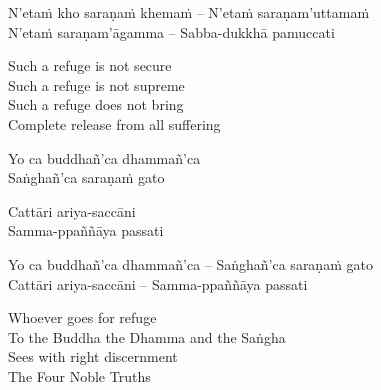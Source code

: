 \else

\begin{verses}
  N'etaṁ kho saraṇaṁ khemaṁ – N'etaṁ saraṇam'uttamaṁ\\
  N'etaṁ saraṇam'āgamma – Sabba-dukkhā pamuccati
\end{verses}

\fi

\begin{english-verses}
  Such a refuge is not secure\\
  Such a refuge is not supreme\\
  Such a refuge does not bring\\
  Complete release from all suffering\ifdigital\makeatletter\hyperlink{endnote32-appendix}\makeatother\fi
\end{english-verses}

\ifninebythirteen

\clearpage

\begin{pali-hang-verses}
  Yo ca buddhañ'ca dhammañ'ca\\
  Saṅghañ'ca saraṇaṁ gato
\end{pali-hang-verses}
\begin{pali-hang-together}
  Cattāri ariya-saccāni\\
  Samma-ppaññāya passati
\end{pali-hang-together}

\else

\begin{verses}
  Yo ca buddhañ'ca dhammañ'ca – Saṅghañ'ca saraṇaṁ gato\\
  Cattāri ariya-saccāni – Samma-ppaññāya passati
\end{verses}

\fi

\begin{english-verses}
  Whoever goes for refuge\ifdigital\makeatletter\hyperlink{endnote162-appendix}\makeatother\fi\\
  To the Buddha the Dhamma and the Saṅgha\ifdigital\makeatletter\hyperlink{endnote163-appendix}\makeatother\fi\\
  Sees with right discernment\\
  The Four Noble Truths
\end{english-verses}

